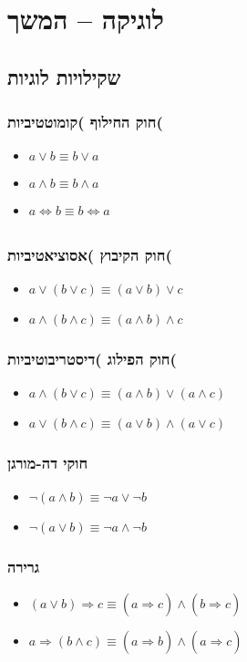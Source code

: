 \documentclass[11pt, oneside]{article}
\newcommand{\opr}[1]{\underset{\text{#1}}{\Rightarrow}}
\newcommand{\bidiarrow}[1]{\underset{\text{#1}}{\Leftrightarrow}}
\begin{document}
\section*{לוגיקה -- המשך}
\subsection*{שקילויות לוגיות}
\subsubsection*{חוק החילוף )קומוטטיביות(}
\begin{itemize}
\item $a \lor b \equiv b \lor a$
\item $a \land b \equiv b \land a$
\item $a \bidiarrow{} b \equiv b \bidiarrow{} a$
\end{itemize}

\subsubsection*{חוק הקיבוץ )אסוציאטיביות(}
\begin{itemize}
\item $a \lor (b \lor c) \equiv (a \lor b) \lor c$
\item $a \land (b \land c) \equiv (a \land b) \land c$
\end{itemize}

\subsubsection*{חוק הפילוג )דיסטריבוטיביות(}
\begin{itemize}
\item $a \land (b \lor c) \equiv (a \land b) \lor (a \land c)$
\item $a \lor (b \land c) \equiv (a \lor b) \land (a \lor c)$
\end{itemize}

\subsubsection*{חוקי דה-מורגן}
\begin{itemize}
\item $\neg (a \land b) \equiv \neg a \lor \neg b$
\item $\neg (a \lor b) \equiv \neg a \land \neg b$
\end{itemize}

\subsubsection*{גרירה}
\begin{itemize}
\item $(a \lor b) \opr{} c \equiv (a \opr{} c) \land (b \opr{} c)$
\item $a \opr{} (b \land c) \equiv (a \opr{} b) \land (a \opr{} c)$
\end{itemize}
\end{document}
